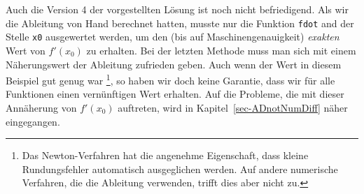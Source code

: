 \documentclass[
  a4paper,
  DIV=11]{scrreprt}
\theoremstyle{definition}
\theoremstyle{definition}
\theoremstyle{remark}
\begin{document}
Auch die Version 4 der vorgestellten Lösung ist noch nicht befriedigend.
Als wir die Ableitung von Hand berechnet hatten, musste nur die Funktion
\texttt{fdot} and der Stelle \texttt{x0} ausgewertet werden, um den (bis
auf Maschinengenauigkeit) \emph{exakten} Wert von \(f'(x_0)\) zu
erhalten. Bei der letzten Methode muss man sich mit einem Näherungswert
der Ableitung zufrieden geben. Auch wenn der Wert in diesem Beispiel gut
genug war \footnote{Das Newton-Verfahren hat die angenehme Eigenschaft,
  dass kleine Rundungsfehler automatisch ausgeglichen werden. Auf andere
  numerische Verfahren, die die Ableitung verwenden, trifft dies aber
  nicht zu.}, so haben wir doch keine Garantie, dass wir für alle
Funktionen einen vernünftigen Wert erhalten. Auf die Probleme, die mit
dieser Annäherung von \(f'(x_0)\) auftreten, wird in
Kapitel~\ref{sec-ADnotNumDiff} näher eingegangen.
\end{document}
